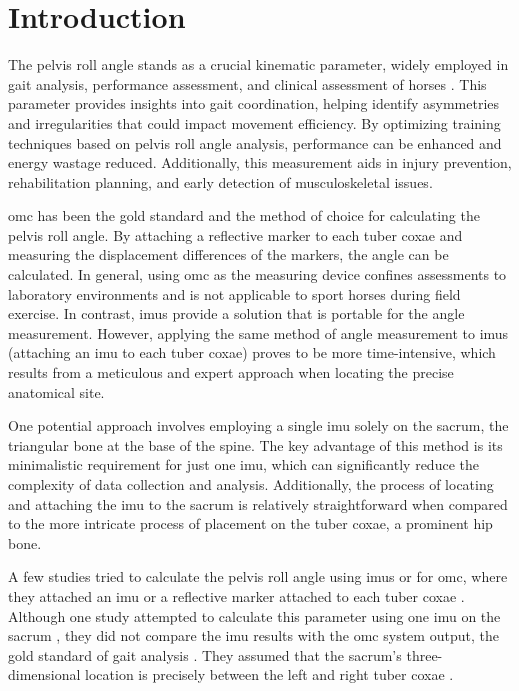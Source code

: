 \section{Introduction}
\label{sec:intro_introduction_pelvis}

The pelvis roll angle stands as a crucial kinematic parameter, widely employed in gait analysis, performance assessment, and clinical assessment of horses  \cite{SerraBraganca2018,Goff2018,Hardeman2019}. This parameter provides insights into gait coordination, helping identify asymmetries and irregularities that could impact movement efficiency. By optimizing training techniques based on pelvis roll angle analysis, performance can be enhanced and energy wastage reduced. Additionally, this measurement aids in injury prevention, rehabilitation planning, and early detection of musculoskeletal issues.

\gls{omc} has been the gold standard and the method of choice for calculating the pelvis roll angle. By attaching a reflective marker to each tuber coxae and measuring the displacement differences of the markers, the angle can be calculated. In general, using \gls{omc} as the measuring device confines assessments to laboratory environments and is not applicable to sport horses during field exercise. In contrast, \gls{imu}s provide a solution that is portable for the angle measurement. However, applying the same method of angle measurement to \gls{imu}s (attaching an \gls{imu} to each tuber coxae) proves to be more time-intensive, which results from a meticulous and expert approach when locating the precise anatomical site.

One potential approach involves employing a single \gls{imu} solely on the sacrum, the triangular bone at the base of the spine. The key advantage of this method is its minimalistic requirement for just one \gls{imu}, which can significantly reduce the complexity of data collection and analysis. Additionally, the process of locating and attaching the \gls{imu} to the sacrum is relatively straightforward when compared to the more intricate process of placement on the tuber coxae, a prominent hip bone.  

A few studies tried to calculate the pelvis roll angle using \gls{imu}s or for \gls{omc}, where they attached an \gls{imu} or a reflective marker attached to each tuber coxae \cite{Day2020,Hardeman2020,Greve2018,SerraBraganca2018,Roepstorff2009}. Although one study attempted to calculate this parameter using one \gls{imu} on the sacrum \cite{Pfau2013}, they did not compare the \gls{imu} results with the \gls{omc} system output, the gold standard of gait analysis \cite{Schmutz2020}. They assumed that the sacrum's three-dimensional location is precisely between the left and right tuber coxae \cite{Pilliner2009TheLocomotion}. 

